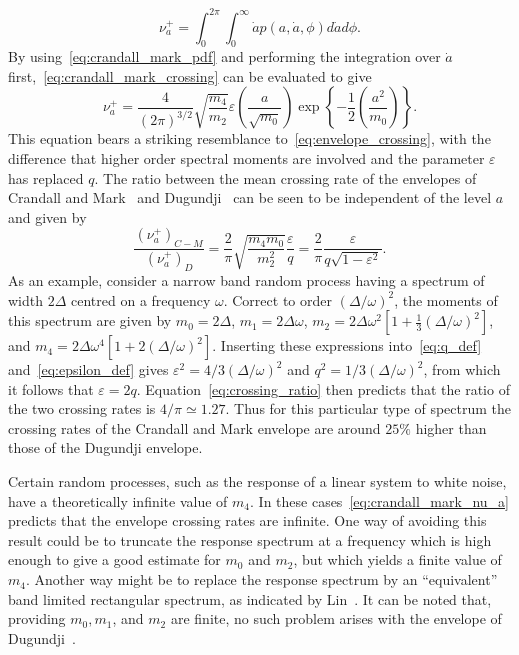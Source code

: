 \documentclass[12pt]{article}
\theoremstyle{plain}
\theoremstyle{definition}
\theoremstyle{remark}
\begin{document}
\begin{equation}
    \nu_a^+ = \int_0^{2\pi} \int_0^\infty \dot{a} p(a, \dot{a}, \phi) d\dot{a} d\phi.
    \label{eq:crandall_mark_crossing}
\end{equation}
By using~\eqref{eq:crandall_mark_pdf} and performing the integration over $\dot{a}$ first,~\eqref{eq:crandall_mark_crossing} can be evaluated to give
\begin{equation}
    \nu_a^+ = \frac{4}{(2\pi)^{3/2}} \sqrt{\frac{m_4}{m_2}} \varepsilon \left( \frac{a}{\sqrt{m_0}} \right) \exp \left\{ -\frac{1}{2} \left( \frac{a^2}{m_0} \right) \right\}.
    \label{eq:crandall_mark_nu_a}
\end{equation}
This equation bears a striking resemblance to~\eqref{eq:envelope_crossing}, with the difference that higher order spectral moments are involved and the parameter $\varepsilon$ has replaced $q$. The ratio between the mean crossing rate of the envelopes of Crandall and Mark~\cite{crandall1963} and Dugundji~\cite{dugundji1958} can be seen to be independent of the level $a$ and given by
\begin{equation}
    \frac{(\nu_a^+)_{C-M}}{(\nu_a^+)_D} = \frac{2}{\pi} \sqrt{\frac{m_4 m_0}{m_2^2}} \frac{\varepsilon}{q} = \frac{2}{\pi} \frac{\varepsilon}{q \sqrt{1 - \varepsilon^2}}.
    \label{eq:crossing_ratio}
\end{equation}
As an example, consider a narrow band random process having a spectrum of width $2\Delta$ centred on a frequency $\omega$. Correct to order $(\Delta/\omega)^2$, the moments of this spectrum are given by $m_0 = 2\Delta$, $m_1 = 2\Delta \omega$, $m_2 = 2\Delta \omega^2 [1 + \frac{1}{3} (\Delta/\omega)^2]$, and $m_4 = 2\Delta \omega^4 [1 + 2(\Delta/\omega)^2]$. Inserting these expressions into~\eqref{eq:q_def} and~\eqref{eq:epsilon_def} gives $\varepsilon^2 = 4/3 (\Delta/\omega)^2$ and $q^2 = 1/3 (\Delta/\omega)^2$, from which it follows that $\varepsilon = 2q$. Equation~\eqref{eq:crossing_ratio} then predicts that the ratio of the two crossing rates is $4/\pi \simeq 1.27$. Thus for this particular type of spectrum the crossing rates of the Crandall and Mark envelope are around $25\%$ higher than those of the Dugundji envelope.

Certain random processes, such as the response of a linear system to white noise, have a theoretically infinite value of $m_4$. In these cases~\eqref{eq:crandall_mark_nu_a} predicts that the envelope crossing rates are infinite. One way of avoiding this result could be to truncate the response spectrum at a frequency which is high enough to give a good estimate for $m_0$ and $m_2$, but which yields a finite value of $m_4$. Another way might be to replace the response spectrum by an ``equivalent'' band limited rectangular spectrum, as indicated by Lin~\cite{lin1967}. It can be noted that, providing $m_0, m_1$, and $m_2$ are finite, no such problem arises with the envelope of Dugundji~\cite{dugundji1958}.
\end{document}
